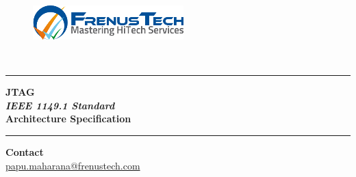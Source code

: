 \begin{titlepage}

\vspace{1cm}
\begin{figure}[H]
\centering
\includegraphics[totalheight=2cm]{images/frenustechLogo50-1.png}
\end{figure}
\vspace{0.5cm}

\begin{center}
\Large{\textsc{\\}}
\hrule %
\vspace{0.1in}
\begin{flushright}
\Huge{ \textbf {JTAG}}\\[0.25cm]
\normalsize{\textit{\textbf{IEEE 1149.1 Standard}}}\\[1cm]
\large{\textbf{Architecture Specification}}
\end{flushright}
\vspace{0.1in}
\hrule
\end{center}

\vspace{14cm}

\begin{flushright}
\textbf{Contact\\} 
\url{papu.maharana@frenustech.com}\\

\end{flushright}


\end{titlepage}